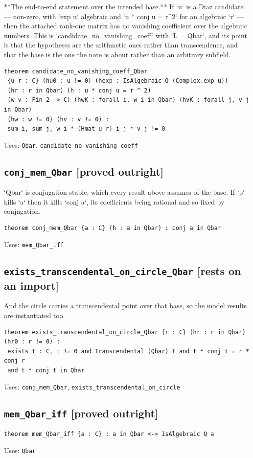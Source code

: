 \documentclass[11pt,a4paper]{article}
\newcommand{\tagon}{\textcolor{onaxc}{\textbf{[rests on an import]}}}
\newcommand{\tagpr}{\textcolor{provedc}{\textbf{[proved outright]}}}
\begin{document}
**The end-to-end statement over the intended base.** If `u` is a Diaz candidate --- non-zero, with `exp u` algebraic and `u * conj u = r\^{}2` for an algebraic `r` --- then the attached rank-one matrix has no vanishing coefficient over the algebraic numbers. This is `candidate\_no\_vanishing\_coeff` with `L = Qbar`, and its point is that the hypotheses are the arithmetic ones rather than transcendence, and that the base is the one the note is about rather than an arbitrary subfield.

\begin{lstlisting}
theorem candidate_no_vanishing_coeff_Qbar
 {u r : C} (hu0 : u != 0) (hexp : IsAlgebraic Q (Complex.exp u))
 (hr : r in Qbar) (h : u * conj u = r ^ 2)
 (w v : Fin 2 -> C) (hwK : forall i, w i in Qbar) (hvK : forall j, v j in Qbar)
 (hw : w != 0) (hv : v != 0) :
 sum i, sum j, w i * (Hmat u r) i j * v j != 0
\end{lstlisting}
\noindent\footnotesize Uses: \texttt{Qbar}, \texttt{candidate\_no\_vanishing\_coeff}\normalsize


\subsection*{\texttt{conj\_mem\_Qbar} \hfill \tagpr}

`Qbar` is conjugation-stable, which every result above assumes of the base. If `p` kills `a` then it kills `conj a`, its coefficients being rational and so fixed by conjugation.

\begin{lstlisting}
theorem conj_mem_Qbar {a : C} (h : a in Qbar) : conj a in Qbar
\end{lstlisting}
\noindent\footnotesize Uses: \texttt{mem\_Qbar\_iff}\normalsize


\subsection*{\texttt{exists\_transcendental\_on\_circle\_Qbar} \hfill \tagon}

And the circle carries a transcendental point over that base, so the model results are instantiated too.

\begin{lstlisting}
theorem exists_transcendental_on_circle_Qbar {r : C} (hr : r in Qbar) (hr0 : r != 0) :
 exists t : C, t != 0 and Transcendental (Qbar) t and t * conj t = r * conj r
 and t * conj t in Qbar
\end{lstlisting}
\noindent\footnotesize Uses: \texttt{conj\_mem\_Qbar}, \texttt{exists\_transcendental\_on\_circle}\normalsize


\subsection*{\texttt{mem\_Qbar\_iff} \hfill \tagpr}
\begin{lstlisting}
theorem mem_Qbar_iff {a : C} : a in Qbar <-> IsAlgebraic Q a
\end{lstlisting}
\noindent\footnotesize Uses: \texttt{Qbar}\normalsize
\end{document}
